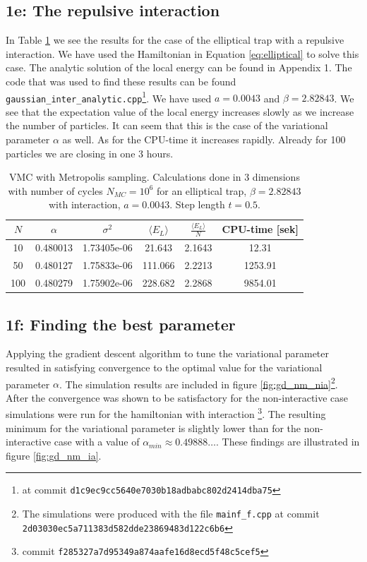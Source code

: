 \subsection*{\textbf{1e:} The repulsive interaction}

In Table \ref{tab:Re.int.} we see the results for the case of the elliptical trap with a repulsive interaction. We have used the Hamiltonian in Equation \ref{eq:elliptical} to solve this case. The analytic solution of the local energy can be found in Appendix 1. The code that was used to find these results can be found \lstinline{gaussian_inter_analytic.cpp}\footnote{at commit \lstinline{d1c9ec9cc5640e7030b18adbabc802d2414dba75}}.
We have used $a = 0.0043$ and $\beta = 2.82843$. We see that the expectation value of the local energy increases slowly as we increase the number of particles. It can seem that this is the case of the variational parameter $\alpha$ as well. 
As for the CPU-time it increases rapidly. Already for 100 particles we are closing in one 3 hours.

\begin{table}[]
    \centering
    \begin{tabular}{|c|c|c|c|c|c|}
    \hline
         $N$ & $\alpha$ & $\sigma^2$ & $\langle E_L \rangle$ & $\frac{\langle E_L \rangle}{N}$ & CPU-time [sek] \\
         \hline
         10 & 0.480013 & 1.73405e-06 & 21.643 & 2.1643 & 12.31 \\
         \hline
         50 & 0.480127 & 1.75833e-06 & 111.066 & 2.2213 & 1253.91\\
         \hline
         100 & 0.480279 & 1.75902e-06 & 228.682 & 2.2868 & 9854.01 \\
         \hline
    \end{tabular}
    \caption{VMC with Metropolis sampling. Calculations done in 3 dimensions with number of cycles $N_{MC} = 10^{6}$ for an elliptical trap, $\beta = 2.82843$ with interaction, $a = 0.0043$. Step length $t = 0.5$.}
    \label{tab:Re.int.}
\end{table}


\subsection*{\textbf{1f:} Finding the best parameter}
Applying the gradient descent algorithm to tune the variational parameter resulted in satisfying convergence to the optimal value for the variational parameter $\alpha$. The simulation results are included in figure \ref{fig:gd_nm_nia}\footnote{The simulations were produced with the file \lstinline{mainf_f.cpp} at commit \lstinline{2d03030ec5a711383d582dde23869483d122c6b6}}. After the convergence was shown to be satisfactory for the non-interactive case simulations were run for the hamiltonian with interaction \footnote{commit \lstinline{f285327a7d95349a874aafe16d8ecd5f48c5cef5}}. The resulting minimum for the variational parameter is slightly lower than for the non-interactive case with a value of $\alpha_{min} \approx 0.49888\ldots$. These findings are illustrated in figure \ref{fig:gd_nm_ia}. 


